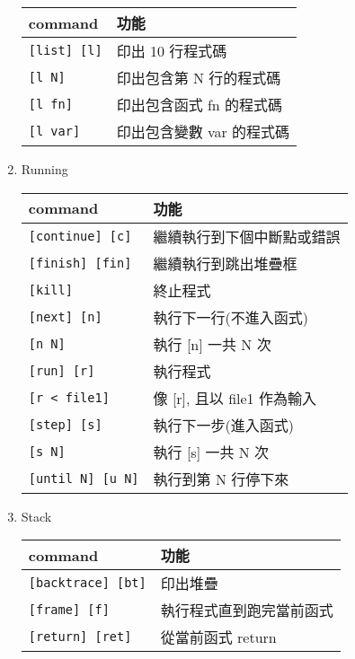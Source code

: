 \begin{enumerate}
    \begin{tabular}{|l|l|}
        \hline
        command                         & 功能 \\
        \hline
        \verb|[list] [l]|               & 印出 10 行程式碼  \\
        \verb|[l N]|                    & 印出包含第 N 行的程式碼  \\
        \verb|[l fn]|                   & 印出包含函式 fn 的程式碼 \\
        \verb|[l var]|                  & 印出包含變數 var 的程式碼 \\
        \hline
    \end{tabular}
    \item Running \par
    \begin{tabular}{|l|l|}
        \hline
        command                         & 功能 \\
        \hline
        \verb|[continue] [c]|           & 繼續執行到下個中斷點或錯誤 \\
        \verb|[finish] [fin]|           & 繼續執行到跳出堆疊框 \\
        \verb|[kill]|                   & 終止程式 \\
        \verb|[next] [n]|               & 執行下一行(不進入函式) \\
        \verb|[n N]|                    & 執行 [n] 一共 N 次 \\
        \verb|[run] [r]|                & 執行程式 \\
        \verb|[r < file1]|              & 像 [r], 且以 file1 作為輸入 \\
        \verb|[step] [s]|               & 執行下一步(進入函式) \\
        \verb|[s N]|                    & 執行 [s] 一共 N 次 \\
        \verb|[until N] [u N]|          & 執行到第 N 行停下來 \\
        \hline
    \end{tabular}
    \item Stack \par
    \begin{tabular}{|l|l|}
        \hline
        command                         & 功能 \\
        \hline
        \verb|[backtrace] [bt]|         & 印出堆疊 \\
        \verb|[frame] [f]|              & 執行程式直到跑完當前函式 \\
        \verb|[return] [ret]|           & 從當前函式 return \\

\end{tabular}
\end{enumerate}
